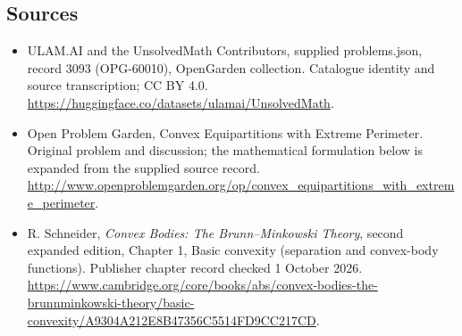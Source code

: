 \documentclass[11pt,a4paper]{article}
\begin{document}
\subsection{Sources}
\begin{itemize}
\item[S1] ULAM.AI and the UnsolvedMath Contributors, supplied problems.json, record 3093 (OPG-60010), OpenGarden collection. Catalogue identity and source transcription; CC BY 4.0.
\url{https://huggingface.co/datasets/ulamai/UnsolvedMath}.
\item[S2] Open Problem Garden, Convex Equipartitions with Extreme Perimeter. Original problem and discussion; the mathematical formulation below is expanded from the supplied source record.
\url{http://www.openproblemgarden.org/op/convex_equipartitions_with_extreme_perimeter}.

\item[A1] R. Schneider, \emph{Convex Bodies: The Brunn--Minkowski Theory}, second expanded edition, Chapter 1, Basic convexity (separation and convex-body functions). Publisher chapter record checked 1 October 2026. \url{https://www.cambridge.org/core/books/abs/convex-bodies-the-brunnminkowski-theory/basic-convexity/A9304A212E8B47356C5514FD9CC217CD}.
\end{itemize}
\end{document}
